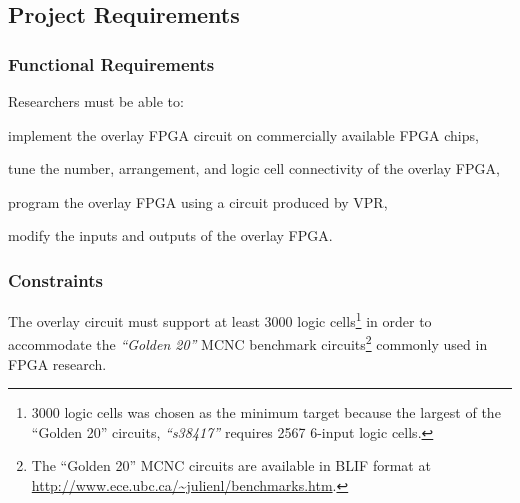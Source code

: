 \subsection{Project Requirements}

%


\subsubsection{Functional Requirements}

Researchers must be able to:
\begin{itemlist}
	\item implement the overlay FPGA circuit on commercially available FPGA chips,
	\item tune the number, arrangement, and logic cell connectivity of the overlay FPGA,
	\item program the overlay FPGA using a circuit produced by VPR,
	\item modify the inputs and outputs of the overlay FPGA.
\end{itemlist}


\subsubsection{Constraints}

\begin{itemlist}
	\item The overlay circuit must support at least 3000 logic cells\footnote{3000 logic cells was chosen as the minimum target because the largest of the ``Golden 20'' circuits, \emph{``s38417''} requires 2567 6-input logic cells\cite{synthesis-density}.} in order to accommodate the \emph{``Golden 20''} MCNC benchmark circuits\footnote{The ``Golden 20'' MCNC circuits are available in BLIF format at \url{http://www.ece.ubc.ca/~julienl/benchmarks.htm}.} commonly used in FPGA research.
\end{itemlist}


